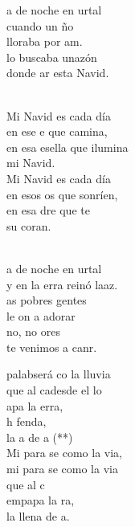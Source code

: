 \documentclass[12pt]{article}
\begin{document}
\begin{multicols*}{2}
\begin{cancion}[Mi Navidad][]%
	a de noche en urtal\\
	cuando un ño\\
	lloraba por am.\\
	lo buscaba unazón \\
	donde ar esta Navid.\\\jump\\
	\begin{chorus}%
	Mi Navid es cada día\\
	en ese e que camina,\\
	en esa esella que ilumina\\
	mi Navid.\\
	Mi Navid es cada día\\
	en esos os que sonríen,\\
	en esa dre que te \\
	su coran. \\
	\end{chorus}%
	\jump\\
	a de noche en urtal\\
	y en la erra reinó laaz.\\
	as pobres gentes\\
	le on a adorar\\
	no, no ores\\
	te venimos a canr.\\
\end{cancion}%

\begin{cancion}[Mi Palabra][Nico]%
	 palabserá co la lluvia\\
	que al cadesde el lo\\
	apa la erra,\\
	h fenda,\\
	la a de a (**)\\
\jump
	Mi para se como la via,\\
	mi para se como la via\\
	que al c  \\
	empapa la ra,\\
	la llena de a.\\
\end{cancion}%


\end{multicols*}
\end{document}
